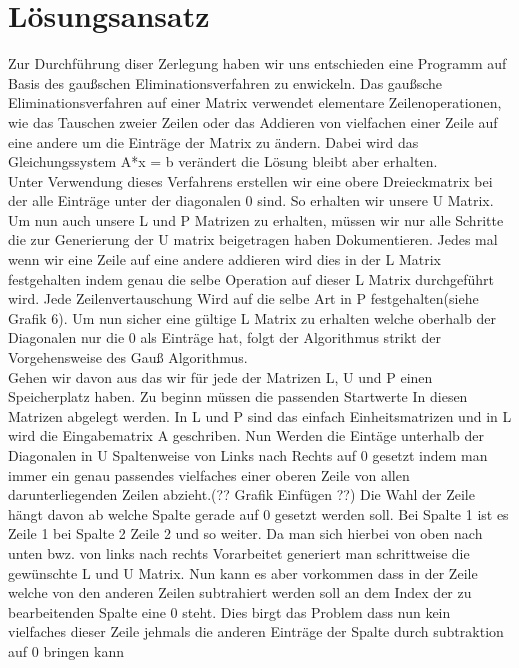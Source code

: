 \documentclass[course=erap]{aspdoc}
\begin{document}
\section{Lösungsansatz}
Zur Durchführung diser Zerlegung haben wir uns entschieden eine Programm auf Basis des gaußschen Eliminationsverfahren zu enwickeln.
 Das gaußsche Eliminationsverfahren auf einer Matrix verwendet elementare Zeilenoperationen, wie das Tauschen zweier Zeilen oder das Addieren von vielfachen einer Zeile auf eine andere
 um die Einträge der Matrix zu ändern. Dabei wird das Gleichungssystem A*x = b verändert die Lösung bleibt aber erhalten.\\
\noindent\hspace*{15mm}%
Unter Verwendung dieses Verfahrens erstellen wir eine obere Dreieckmatrix bei der alle Einträge unter der 
diagonalen 0 sind. So erhalten wir unsere U Matrix. Um nun auch unsere L und P Matrizen zu erhalten, müssen
wir nur alle Schritte die zur Generierung der U matrix beigetragen haben Dokumentieren. Jedes mal wenn wir eine Zeile auf eine andere addieren
wird dies in der L Matrix festgehalten indem genau die selbe Operation auf dieser L Matrix durchgeführt wird. Jede Zeilenvertauschung Wird auf die selbe Art in P festgehalten(siehe Grafik 6).  
Um nun sicher eine gültige L Matrix zu erhalten welche oberhalb der Diagonalen nur die 0 als Einträge hat, folgt der Algorithmus strikt der Vorgehensweise des Gauß Algorithmus.\\
\noindent\hspace*{15mm}%
 Gehen wir davon aus das wir für jede der Matrizen L, U und P einen Speicherplatz haben.
Zu beginn müssen die passenden Startwerte In diesen Matrizen abgelegt werden. In L und P sind das einfach Einheitsmatrizen und in L wird die Eingabematrix A geschriben. Nun Werden die Eintäge unterhalb der Diagonalen in U  
Spaltenweise von Links nach Rechts auf 0 gesetzt indem man immer ein genau passendes vielfaches einer oberen Zeile von allen darunterliegenden 
Zeilen abzieht.(?? Grafik Einfügen ??) Die Wahl der Zeile hängt davon ab welche Spalte gerade auf 0 gesetzt werden soll. 
Bei Spalte 1 ist es Zeile 1 bei Spalte 2 Zeile 2 und so weiter. Da man sich hierbei von oben nach unten bwz. von links nach rechts Vorarbeitet generiert man schrittweise
die gewünschte L und U Matrix. Nun kann es aber vorkommen dass in der Zeile welche von den anderen Zeilen subtrahiert werden soll an dem Index der zu bearbeitenden
Spalte eine 0 steht. Dies birgt das Problem dass nun kein vielfaches dieser Zeile jehmals die anderen Einträge der Spalte durch subtraktion auf 0 bringen kann
\end{document}
